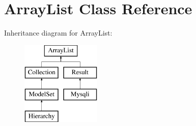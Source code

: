 \hypertarget{classArrayList}{
\section{ArrayList Class Reference}
\label{classArrayList}
}
Inheritance diagram for ArrayList:\begin{figure}[H]
\begin{center}
\leavevmode
\includegraphics[height=4.000000cm]{classArrayList}
\end{center}
\end{figure}
